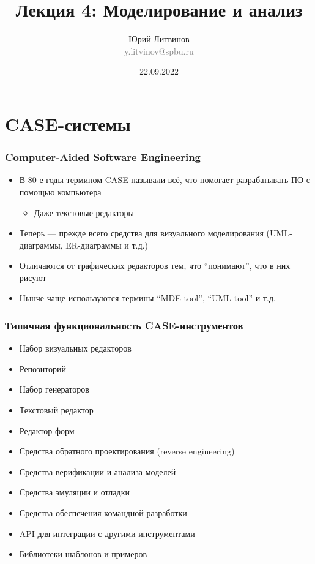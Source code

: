 \documentclass[xetex,mathserif,serif]{beamer}
\title[Моделирование и анализ]{Лекция 4: Моделирование и анализ}
\author[Юрий Литвинов]{Юрий Литвинов\\\small{\textcolor{gray}{y.litvinov@spbu.ru}}}
\date{22.09.2022}
\begin{document}
    \begin{frame}[plain]
        \titlepage
    \end{frame}

    \section{CASE-системы}
    
    \begin{frame}
        \frametitle{Computer-Aided Software Engineering}
        \begin{itemize}
            \item В 80-е годы термином CASE называли всё, что помогает разрабатывать ПО с помощью компьютера
            \begin{itemize}
                \item Даже текстовые редакторы
            \end{itemize}
            \item Теперь --- прежде всего средства для визуального моделирования (UML-диаграммы, ER-диаграммы и т.д.)
            \item Отличаются от графических редакторов тем, что ``понимают'', что в них рисуют
            \item Нынче чаще используются термины ``MDE tool'', ``UML tool'' и т.д.
        \end{itemize}
    \end{frame}

    \begin{frame}
        \frametitle{Типичная функциональность CASE-инструментов}
        \begin{itemize}
            \item Набор визуальных редакторов
            \item Репозиторий
            \item Набор генераторов
            \item Текстовый редактор
            \item Редактор форм
            \item Средства обратного проектирования (reverse engineering)
            \item Средства верификации и анализа моделей
            \item Средства эмуляции и отладки
            \item Средства обеспечения командной разработки
            \item API для интеграции с другими инструментами
            \item Библиотеки шаблонов и примеров
        \end{itemize}
    \end{frame}
\end{document}
